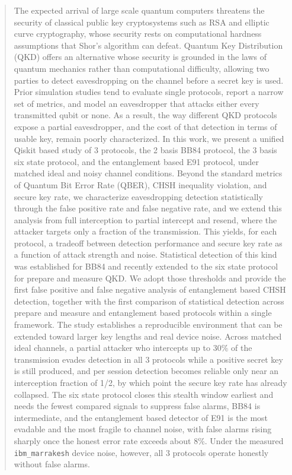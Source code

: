 \documentclass[conference]{IEEEtran}
\begin{document}
\begin{abstract} The expected arrival of large scale quantum computers
threatens the security of classical public key cryptosystems such as RSA and
elliptic curve cryptography, whose security rests on computational hardness
assumptions that Shor's algorithm can defeat. Quantum Key Distribution (QKD)
offers an alternative whose security is grounded in the laws of quantum
mechanics rather than computational difficulty, allowing two parties to detect
eavesdropping on the channel before a secret key is used. Prior simulation
studies tend to evaluate single protocols, report a narrow set of metrics, and
model an eavesdropper that attacks either every transmitted qubit or none. As a
result, the way different QKD protocols expose a partial eavesdropper, and the
cost of that detection in terms of usable key, remain poorly characterized. In
this work, we present a unified Qiskit based study of 3 protocols, the 2
basis BB84 protocol, the 3 basis six state protocol, and the entanglement
based E91 protocol, under matched ideal and noisy channel conditions. Beyond the
standard metrics of Quantum Bit Error Rate (QBER), CHSH inequality violation,
and secure key rate, we characterize eavesdropping detection statistically
through the false positive rate and false negative rate, and we extend this
analysis from full interception to partial intercept and resend, where the
attacker targets only a fraction of the transmission. This yields, for each
protocol, a tradeoff between detection performance and secure key rate as a
function of attack strength and noise. Statistical detection of this kind was
established for BB84 and recently extended to the six state protocol for prepare
and measure QKD. We adopt those thresholds and provide the first false positive
and false negative analysis of entanglement based CHSH detection, together with
the first comparison of statistical detection across prepare and measure and
entanglement based protocols within a single framework. The study establishes a
reproducible environment that can be extended toward larger key lengths and
real device noise. Across matched ideal channels, a partial attacker who
intercepts up to 30\% of the transmission evades detection in all
3 protocols while a positive secret key is still produced, and per session
detection becomes reliable only near an interception fraction of 1/2, by
which point the secure key rate has already collapsed. The six state protocol
closes this stealth window earliest and needs the fewest compared signals to
suppress false alarms, BB84 is intermediate, and the entanglement based detector
of E91 is the most evadable and the most fragile to channel noise, with false
alarms rising sharply once the honest error rate exceeds about 8\%.
Under the measured \texttt{ibm\_marrakesh} device noise, however, all 3
protocols operate honestly without false alarms.
\end{abstract}
\end{document}
